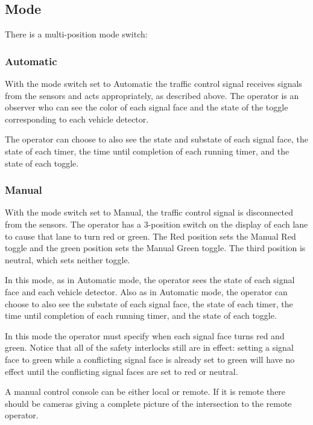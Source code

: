 \documentclass[letterpaper,twoside]{article}
\begin{document}
\subsection{Mode}

There is a multi-position mode switch:

\subsubsection{Automatic}

With the mode switch set to Automatic the traffic control signal
receives signals from the sensors and acts appropriately, as described
above.  The operator is an observer who can see the color of each
signal face and the state of the toggle corresponding to each vehicle detector.

The operator can choose to also see the state and substate of each signal
face, the state of each timer, the time until completion of each
running timer, and the state of each toggle.

\subsubsection{Manual}

With the mode switch set to Manual, the traffic control signal is
disconnected from the sensors.  The operator has
a 3-position switch on the display of each lane to cause that lane to turn red
or green.  The Red position sets the Manual
Red toggle and the green position sets the Manual Green toggle.
The third position is neutral, which sets neither toggle.

In this mode, as in Automatic mode, the operator sees the state of
each signal face and each vehicle detector.  Also as in Automatic mode,
the operator can choose to also see the substate of each signal face,
the state of each timer, the time until completion of each running
timer, and the state of each toggle.

In this mode the operator must specify when each signal face turns
red and green.  Notice that all of the safety interlocks still
are in effect: setting a signal face to green while a conflicting
signal face is already set to green will have no effect until the
conflicting signal faces are set to red or neutral.

A manual control console can be either local or remote.  If it is remote
there should be cameras giving a complete picture of the intersection
to the remote operator.
\end{document}
